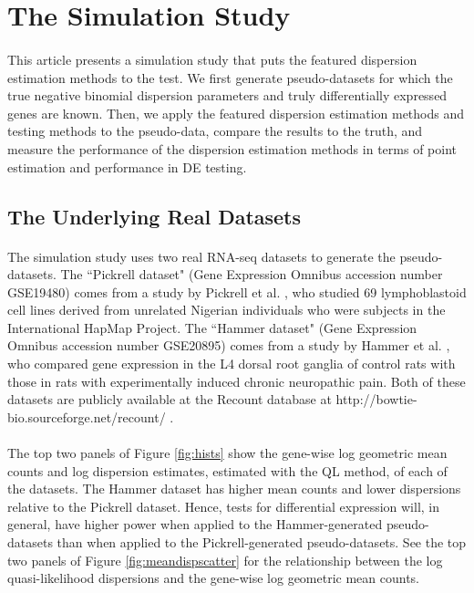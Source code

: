\documentclass[10pt]{article}
\begin{document}
\section*{The Simulation Study}

\paragraph{} \indent This article presents a simulation study that puts the featured dispersion estimation methods to the test. We first generate pseudo-datasets for which the true negative binomial dispersion parameters and truly differentially expressed genes are known. Then, we apply the featured dispersion estimation methods and testing methods to the pseudo-data, compare the results to the truth, and measure the performance of the dispersion estimation methods in terms of point estimation and performance in DE testing.

\subsection*{The Underlying Real Datasets} \label{sec:thisdata}

\paragraph{} \indent The simulation study uses two real RNA-seq datasets to generate the pseudo-datasets. The ``Pickrell dataset" (Gene Expression Omnibus accession number GSE19480) comes from a study by Pickrell et al. \cite{pickrell}, who studied 69 lymphoblastoid cell lines derived from unrelated Nigerian individuals who were subjects in the International HapMap Project. The ``Hammer dataset" (Gene Expression Omnibus accession number GSE20895) comes from a study by Hammer et al. \cite{hammer}, who compared gene expression in the L4 dorsal root ganglia of control rats with those in rats with experimentally induced chronic neuropathic pain. Both of these datasets are publicly available at the Recount database at {http://bowtie-bio.sourceforge.net/recount/} \cite{recount}.

\paragraph{} \indent The top two panels of Figure \ref{fig:hists} show the gene-wise log geometric mean counts and log dispersion estimates, estimated with the QL method, of each of the datasets. The Hammer dataset has higher mean counts and lower dispersions relative to the Pickrell dataset. Hence, tests for differential expression will, in general, have higher power when applied to the Hammer-generated pseudo-datasets than when applied to the Pickrell-generated pseudo-datasets. See the top two panels of Figure \ref{fig:meandispscatter} for the relationship between the log quasi-likelihood dispersions and the gene-wise log geometric mean counts.
\end{document}
